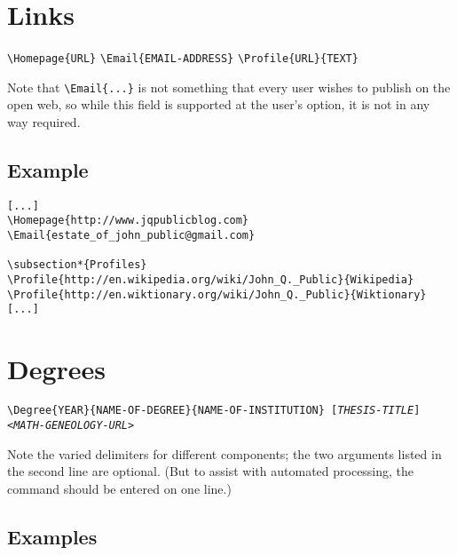 \documentclass[letterpaper]{article}
\begin{document}
\section{Links}


\begin{mdframed}
\texttt{\textbackslash Homepage\{URL\}} \quad
\texttt{\textbackslash Email\{EMAIL-ADDRESS\}} \quad
\texttt{\textbackslash Profile\{URL\}\{TEXT\}}
\end{mdframed}

Note that \verb|\Email{...}| is not something that every user wishes
to publish on the open web, so while this field is supported at the
user's option, it is not in any way required.  

\subsection*{Example}

\begin{verbatim}
[...]
\Homepage{http://www.jqpublicblog.com}
\Email{estate_of_john_public@gmail.com}

\subsection*{Profiles}
\Profile{http://en.wikipedia.org/wiki/John_Q._Public}{Wikipedia}
\Profile{http://en.wiktionary.org/wiki/John_Q._Public}{Wiktionary}
[...]
\end{verbatim}

\section{Degrees}

\begin{mdframed}
\texttt{\textbackslash Degree\{YEAR\}\{NAME-OF-DEGREE\}\{NAME-OF-INSTITUTION\}\newline
\hspace*{2cm}[\emph{THESIS-TITLE}]<\emph{MATH-GENEOLOGY-URL}>}
\end{mdframed}

Note the varied delimiters for different components; the two arguments
listed in the second line are optional.  (But to assist with automated
processing, the command should be entered on one line.)

\subsection*{Examples}
\end{document}
